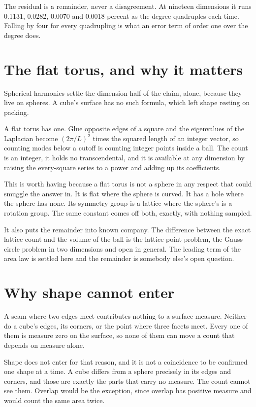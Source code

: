 The residual is a remainder, never a disagreement. At nineteen dimensions it runs 0.1131, 0.0282, 0.0070 and 0.0018 percent as the degree quadruples each time. Falling by four for every quadrupling is what an error term of order one over the degree does.

\section{The flat torus, and why it matters}

Spherical harmonics settle the dimension half of the claim, alone, because they live on spheres. A cube's surface has no such formula, which left shape resting on packing.

A flat torus has one. Glue opposite edges of a square and the eigenvalues of the Laplacian become $(2\pi/L)^2$ times the squared length of an integer vector, so counting modes below a cutoff is counting integer points inside a ball. The count is an integer, it holds no transcendental, and it is available at any dimension by raising the every-square series to a power and adding up its coefficients.

This is worth having because a flat torus is not a sphere in any respect that could smuggle the answer in. It is flat where the sphere is curved. It has a hole where the sphere has none. Its symmetry group is a lattice where the sphere's is a rotation group. The same constant comes off both, exactly, with nothing sampled.

It also puts the remainder into known company. The difference between the exact lattice count and the volume of the ball is the lattice point problem, the Gauss circle problem in two dimensions and open in general. The leading term of the area law is settled here and the remainder is somebody else's open question.

\section{Why shape cannot enter}

A seam where two edges meet contributes nothing to a surface measure. Neither do a cube's edges, its corners, or the point where three facets meet. Every one of them is measure zero on the surface, so none of them can move a count that depends on measure alone.

Shape does not enter for that reason, and it is not a coincidence to be confirmed one shape at a time. A cube differs from a sphere precisely in its edges and corners, and those are exactly the parts that carry no measure. The count cannot see them. Overlap would be the exception, since overlap has positive measure and would count the same area twice.

